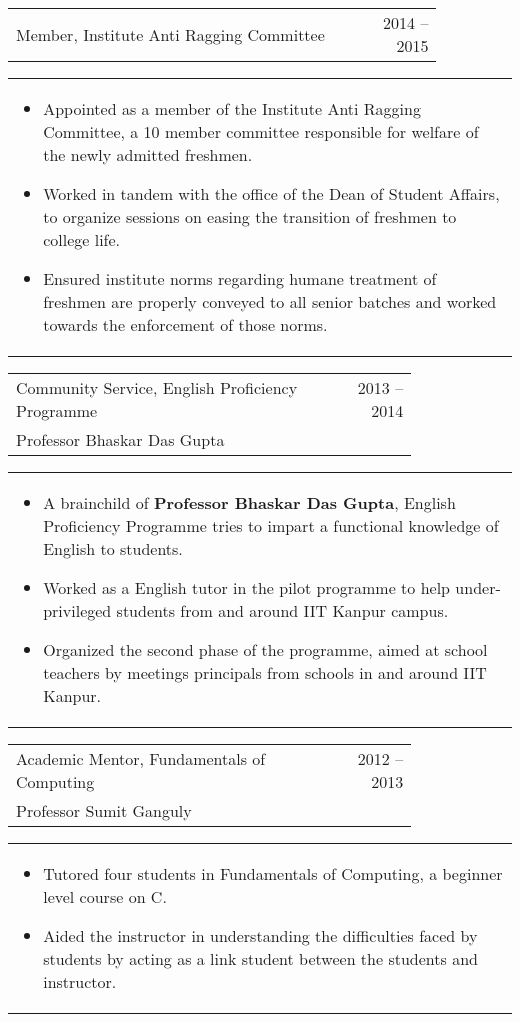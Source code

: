 \documentclass[a4paper,10pt]{article} %
\newcommand{\lproject}[4]{
    \begin{tabular}{p{0.80\linewidth}r}
        \textcolor{NavyBlue}{#2} & \multicolumn{1}{m{4cm}}{\raggedleft \textsc{#1}}\\
        #3
    \end{tabular}
    \begin{tabular}{p{\linewidth}}
    \vspace{-0.3cm}
        \footnotesize{#4}
    \end{tabular}
    \vspace{-0.5cm}
}
\newcommand{\iproject}[3]{
    \begin{tabular}{p{0.85\linewidth}r}
        \textcolor{NavyBlue}{#2} & \multicolumn{1}{m{3cm}}{\raggedleft \textsc{#1}}\\
    \end{tabular}
    \begin{tabular}{p{\linewidth}}
    \vspace{-0.3cm}
        \footnotesize{#3}
    \end{tabular}
    \vspace{-0.5cm}
}
\begin{document}
\iproject {2014 -- 2015}
          {Member, Institute Anti Ragging Committee}
          {
               \begin{itemize}[leftmargin=0.5cm]
                   \item Appointed as a member of the Institute Anti Ragging Committee, a 10 member committee responsible
                       for welfare of the newly admitted freshmen.
                   \item Worked in tandem with the office of the Dean of Student Affairs, to organize sessions
                       on easing the transition of freshmen to college life.
                   \item Ensured institute norms regarding humane treatment of freshmen are properly conveyed to all senior batches
                       and worked towards the enforcement of those norms.
               \end{itemize}
          }

\lproject {2013 -- 2014}
          {Community Service, English Proficiency Programme}
          {Professor Bhaskar Das Gupta}
          {
               \begin{itemize}[leftmargin=0.5cm]
                   \item A brainchild of \textbf{Professor Bhaskar Das Gupta}, English Proficiency Programme tries to impart a functional
                       knowledge of English to students.
                   \item Worked as a English tutor in the pilot programme to help under-privileged students from and around IIT Kanpur campus.
                   \item Organized the second phase of the programme, aimed at school teachers by meetings principals from schools in and
                       around IIT Kanpur.
               \end{itemize}
          }

\lproject {2012 -- 2013}
          {Academic Mentor, Fundamentals of Computing}
          {Professor Sumit Ganguly}
          {
               \begin{itemize}[leftmargin=0.5cm]
                   \item Tutored four students in Fundamentals of Computing, a beginner level course on C.
                   \item Aided the instructor in understanding the difficulties faced by students by acting as a link
                       student between the students and instructor.
               \end{itemize}
          }
\end{document}
